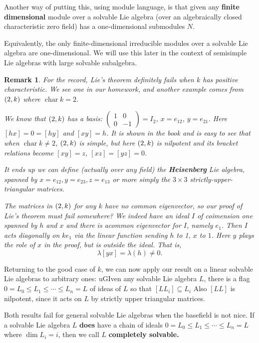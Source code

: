 \documentclass[12pt]{article}
\theoremstyle{nonumberbreak}
\theoremstyle{changebreak}
\theoremstyle{nonumberbreak}
\theoremstyle{change}
\newtheorem{rmk}[thm]{Remark}
\DeclareMathOperator{\ch}{char}
\let\sl\relax
\DeclareMathOperator{\sl}{\mathfrak{sl}}
\begin{document}
Another way of putting this, using module language, is that given any \textbf{finite dimensional} module over
a solvable Lie algebra (over an algebraically closed characteristic zero field) has a one-dimensional submodules $N$.

Equivalently, the only finite-dimensional irreducible modules over a solvable Lie algebra are one-dimensional. We 
will use this later in the context of semisimple Lie algebras with large solvable subalgebra.

\begin{rmk}
	For the record, Lie's theorem \textit{definitely fails} when $k$ has positive characteristic.
	We see one in our homework, and another example comes from $\sl(2,k)$ where $\ch k=2.$

	We know that $\sl(2,k)$ has a basis: $(\begin{smallmatrix}
		1&0\\0&-1
	\end{smallmatrix})=I_2$, $x=e_{12}$, $y=e_{21}$. Here $[hx]=0=[hy]$ and $[xy]=h$. It is shown in the book
	and is easy to see that when $\ch k\ne 2$, $\sl(2,k)$ is simple, but here $\sl(2,k)$ is nilpotent and its
	bracket relations become $[xy]=z$, $[xz]=[yz]=0$.

	It ends up we can define (actually over any field) the \textbf{Heisenberg} Lie algebra, spanned
	by $x=e_{12},y=e_{23},z=e_{13}$ or more simply the $3\times 3$ strictly-upper-triangular matrices.

	The matrices in $\sl(2,k)$ for any $k$ have no common eigenvector, so our proof of Lie's theorem must
	fail somewhere? We indeed have an ideal $I$ of coimension one spanned by $h$ and $x$ and there is acommon eigenvector for $I$, 
	namely $e_1$. Then $I$ acts diagonally on $ke_1$ via the linear function sending $h$ to 1, $x$ to $1$. 
	Here $y$ plays the role of $x$ in the proof, but is outside the ideal. That is,
	\[\lambda[yx]=\lambda(h)\ne 0.\]
\end{rmk}

Returning to the good case of $k$, we can now apply our result on a linear solvable Lie algebras to arbitrary ones:
uGIven any solvable Lie algebra $L$, there is a flag $0=L_0\le L_1\le\cdots\le L_n=L$ of ideas of $L$
so that $[LL_i]\subseteq L_i$ Also $[LL]$ is nilpotent, since it acts on $L$ by strictly upper triangular matrices.

Both results fail for general solvable Lie algebras when the basefield is not nice. If a solvable Lie algebra $L$ 
\textbf{does} have a chain of ideals $0=L_0\le L_1\le\cdots\le L_n=L$ where $\dim L_i=i$, then we call $L$ \textbf{completely solvable.}
\end{document}
